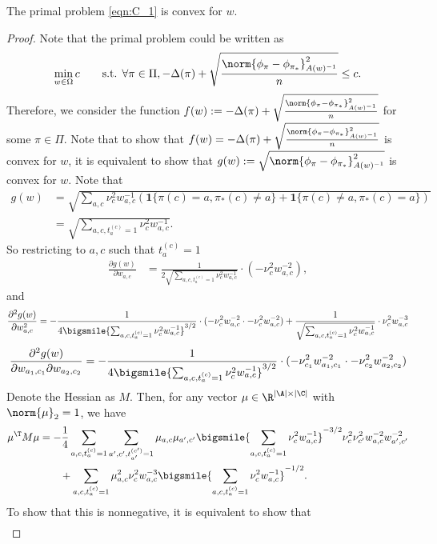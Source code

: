 \documentclass{article}
\newcommand{\1}{\mathbf{1}}
\begin{document}
\begin{lemma}\label{lem:primal_convex}
The primal problem \eqref{eqn:C_1} is convex for $w$. 
\end{lemma}
\begin{proof}
Note that the primal problem could be written as 
\[\min_{w\in\Omega} c\qquad \textrm{s.t. }\forall\pi\in\Pi,-\Delta(\pi)+\sqrt{\frac{\norm{\phi_{\pi}-\phi_{\pi_*}}_{A(w)^{-1}}^2}{n}}\leq c. \]
Therefore, we consider the function $f(w):=-\Delta(\pi)+\sqrt{\frac{\norm{\phi_{\pi}-\phi_{\pi_*}}_{A(w)^{-1}}^2}{n}}$ for some $\pi\in\Pi$. Note that to show that $f(w)=-\Delta(\pi)+\sqrt{\frac{\norm{\phi_{\pi}-\phi_{\pi_*}}_{A(w)^{-1}}^2}{n}}$ is convex for $w$, it is equivalent to show that $g(w):=\sqrt{\norm{\phi_{\pi}-\phi_{\pi_*}}_{A(w)^{-1}}^2}$ is convex for $w$. Note that 
\begin{align*}
    g(w)&=\sqrt{\sum_{a,c}\nu_c^2w_{a,c}^{-1}(\1\{\pi(c)=a,\pi_*(c)\ne a\}+\1\{\pi(c)\ne a,\pi_*(c)=a\})}\\
    &= \sqrt{\sum_{a,c,t_a^{(c)}=1}\nu_c^2w_{a,c}^{-1}}.
\end{align*}
So restricting to $a,c$ such that $t_a^{(c)}=1$
\begin{align*}
    \frac{\partial g(w)}{\partial w_{a,c}} &= \frac{1}{2\sqrt{\sum_{a,c,t_a^{(c)}=1}\nu_c^2w_{a,c}^{-1}}}\cdot(-\nu_c^2 w_{a,c}^{-2}),
\end{align*}
and 
    \[\frac{\partial^2 g(w)}{\partial w_{a,c}^2} = -\frac{1}{4\bigsmile{\sum_{a,c,t_a^{(c)}=1}\nu_c^2w_{a,c}^{-1}}^{3/2}}\cdot(-\nu_c^2 w_{a,c}^{-2}\cdot-\nu_c^2 w_{a,c}^{-2})+\frac{1}{\sqrt{\sum_{a,c,t_a^{(c)}=1}\nu_c^2w_{a,c}^{-1}}}\cdot \nu_c^2w_{a,c}^{-3}\]
    \[
    \frac{\partial^2 g(w)}{\partial w_{a_1,c_1}\partial w_{a_2,c_2}} = -\frac{1}{4\bigsmile{\sum_{a,c,t_a^{(c)}=1}\nu_c^2w_{a,c}^{-1}}^{3/2}}\cdot(-\nu_{c_1}^2 w_{a_1,c_1}^{-2}\cdot-\nu_{c_2}^2 w_{a_2,c_2}^{-2})
    \]
Denote the Hessian as $M$. Then, for any vector $\mu\in\R^{|\A|\times|\C|}$ with $\norm{\mu}_2=1$, we have 
\begin{align*}
    \mu^\T M\mu &= -\frac{1}{4}\sum_{a,c,t_a^{(c)}=1}\sum_{a',c',t_{a'}^{(c')}=1} \mu_{a,c}\mu_{a',c'} \bigsmile{\sum_{a,c,t_a^{(c)}=1}\nu_c^2w_{a,c}^{-1}}^{-3/2}\nu_{c}^2\nu_{c'}^2 w_{a,c}^{-2} w_{a',c'}^{-2}\\
    &\qquad+\sum_{a,c,t_a^{(c)}=1}\mu_{a,c}^2\nu_c^2w_{a,c}^{-3}\bigsmile{\sum_{a,c,t_a^{(c)}=1}\nu_c^2w_{a,c}^{-1}}^{-1/2}.
\end{align*}
To show that this is nonnegative, it is equivalent to show that 
{
\small
\begin{align*}

\end{align*}}
\end{proof}
\end{document}
